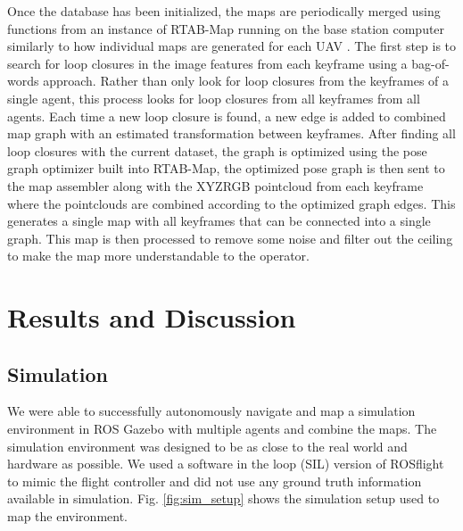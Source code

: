 \documentclass[letterpaper, 10 pt, conference]{ieeeconf}  %
\begin{document}
Once the database has been initialized, the maps are periodically merged using functions from an instance of RTAB-Map running on the base station computer similarly to how individual maps are generated for each UAV \cite{Labbe2011}\cite{Labbe2013}\cite{Labbe2019}. The first step is to search for loop closures in the image features from each keyframe using a bag-of-words approach. Rather than only look for loop closures from the keyframes of a single agent, this process looks for loop closures from all keyframes from all agents. Each time a new loop closure is found, a new edge is added to combined map graph with an estimated transformation between keyframes. After finding all loop closures with the current dataset, the graph is optimized using the pose graph optimizer built into RTAB-Map, the optimized pose graph is then sent to the map assembler along with the XYZRGB pointcloud from each keyframe where the pointclouds are combined according to the optimized graph edges. This generates a single map with all keyframes that can be connected into a single graph. This map is then processed to remove some noise and filter out the ceiling to make the map more understandable to the operator.
\section{Results and Discussion}\label{results}

\subsection{Simulation}

We were able to successfully autonomously navigate and map a simulation environment in ROS Gazebo with multiple agents and combine the maps. The simulation environment was designed to be as close to the real world and hardware as possible. We used a software in the loop (SIL) version of ROSflight to mimic the flight controller and did not use any ground truth information available in simulation. Fig. \ref{fig:sim_setup} shows the simulation setup used to map the environment.
\end{document}
